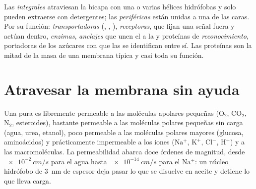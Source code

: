 \begin{definition}\label{def:b1:membranes-transport:proteins}
Las  \emph{integrales}
atraviesan la bicapa con una o varias hélices hidrófobas y solo pueden
extraerse con detergentes; las \emph{periféricas} están unidas a una de las
caras. Por su función: \emph{transportadoras} (, ,
), \emph{receptoras}, que fijan una señal fuera y actúan dentro,
\emph{enzimas}, \emph{anclajes} que unen el  a la  y proteínas de \emph{reconocimiento}, portadoras de los
azúcares con que las  se identifican entre sí. Las proteínas son la
mitad de la masa de una membrana típica y casi toda su función.
\end{definition}

\section{Atravesar la membrana sin ayuda}

\begin{proposition}\label{prop:b1:membranes-transport:permeability}
Una  pura es libremente permeable a las moléculas apolares
pequeñas ($\mathrm{O_2}$, $\mathrm{CO_2}$, $\mathrm{N_2}$, esteroides),
bastante permeable a las moléculas polares pequeñas sin carga (agua, urea,
etanol), poco permeable a las moléculas polares mayores (glucosa,
aminoácidos) y prácticamente impermeable a los iones ($\mathrm{Na^+}$,
$\mathrm{K^+}$, $\mathrm{Cl^-}$, $\mathrm{H^+}$) y a las macromoléculas. La
permeabilidad abarca doce órdenes de magnitud, desde $\qty{e-2}{cm/s}$ para
el agua hasta $\qty{e-14}{cm/s}$ para el $\mathrm{Na^+}$: un núcleo hidrófobo
de \qty{3}{nm} de espesor deja pasar lo que se disuelve en aceite y detiene
lo que lleva carga.
\end{proposition}

